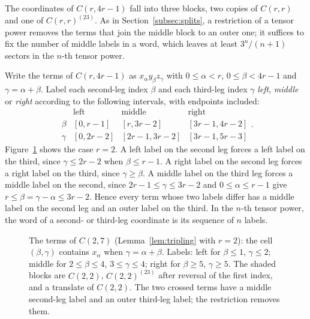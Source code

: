 The coordinates of \(C(r,4r-1)\) fall into three blocks, two copies of
\(C(r,r)\) and one of \(C(r,r)^{(23)}\). As in Section~\ref{subsec:splits},
a restriction of a tensor power removes the terms that join the middle
block to an outer one; it suffices to fix the number of middle labels in a
word, which leaves at least \(3^n/(n+1)\) sectors in the \(n\)-th tensor
power.

Write the terms of \(C(r,4r-1)\) as \(x_\alpha y_\beta z_\gamma\) with
\(0\le\alpha<r\), \(0\le\beta<4r-1\) and \(\gamma=\alpha+\beta\). Label
each second-leg index \(\beta\) and each third-leg index \(\gamma\)
\emph{left}, \emph{middle} or \emph{right} according to the following
intervals, with endpoints included:
\[
\begin{array}{c|ccc}
 &\text{left}&\text{middle}&\text{right}\\ \hline
 \beta &[0,r-1]&[r,3r-2]&[3r-1,4r-2]\\
 \gamma &[0,2r-2]&[2r-1,3r-2]&[3r-1,5r-3]
\end{array}.
\]
Figure~\ref{fig:tripling} shows the case \(r=2\). A left label on the
second leg forces a left label on the third, since \(\gamma\le2r-2\) when
\(\beta\le r-1\). A right label on the second leg forces a right label on
the third, since \(\gamma\ge\beta\). A middle label on the third leg
forces a middle label on the second, since \(2r-1\le\gamma\le3r-2\) and
\(0\le\alpha\le r-1\) give \(r\le\beta=\gamma-\alpha\le3r-2\). Hence
every term whose two labels differ has a middle label on the second leg
and an outer label on the third. In the \(n\)-th tensor power, the word of
a second- or third-leg coordinate is its sequence of \(n\) labels.

\begin{figure}[htb]
\centering
{}
\caption{The terms of \(C(2,7)\) (Lemma~\ref{lem:tripling} with
\(r=2\)): the cell \((\beta,\gamma)\) contains \(x_\alpha\) when
\(\gamma=\alpha+\beta\). Labels: left for \(\beta\le1\), \(\gamma\le2\);
middle for \(2\le\beta\le4\), \(3\le\gamma\le4\); right for \(\beta\ge5\),
\(\gamma\ge5\). The shaded blocks are \(C(2,2)\), \(C(2,2)^{(23)}\) after
reversal of the first index, and a translate of \(C(2,2)\). The two crossed
terms have a middle second-leg label and an outer third-leg label; the
restriction removes them.}
\label{fig:tripling}
\end{figure}

